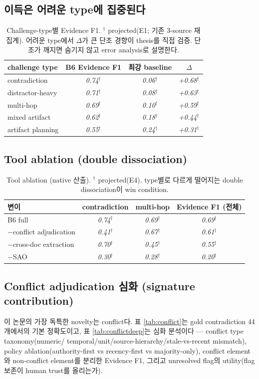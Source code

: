 \documentclass[11pt]{article}
\newcommand{\proj}[1]{\textit{#1}$^\dagger$}
\begin{document}
\subsection{이득은 어려운 type에 집중된다}
\begin{table}[h]
\centering\small
\begin{tabular}{lccc}
\toprule
challenge type & B6 Evidence F1 & 최강 baseline & $\Delta$ \\
\midrule
contradiction     & \proj{0.74} & \proj{0.06} & \proj{+0.68} \\
distractor-heavy  & \proj{0.71} & \proj{0.08} & \proj{+0.63} \\
multi-hop         & \proj{0.69} & \proj{0.10} & \proj{+0.59} \\
mixed artifact    & \proj{0.62} & \proj{0.18} & \proj{+0.44} \\
artifact planning & \proj{0.55} & \proj{0.24} & \proj{+0.31} \\
\bottomrule
\end{tabular}
\caption{Challenge-type별 Evidence F1. $^\dagger$ projected(E1; 기존 3-source 재집계). 어려운
type에서 $\Delta$가 큰 단조 경향이 thesis를 직접 검증. 단조가 깨지면 숨기지 않고 error analysis로
설명한다.}
\label{tab:bytype}
\end{table}

\subsection{Tool ablation (double dissociation)}
\begin{table}[h]
\centering\small
\begin{tabular}{lccc}
\toprule
변이 & contradiction & multi-hop & Evidence F1 (전체) \\
\midrule
B6 full & \proj{0.74} & \proj{0.69} & \proj{0.69} \\
$-$conflict adjudication & \proj{0.41} & \proj{0.67} & \proj{0.61} \\
$-$cross-doc extraction & \proj{0.70} & \proj{0.45} & \proj{0.55} \\
$-$SAO & \proj{0.30} & \proj{0.28} & \proj{0.20} \\
\bottomrule
\end{tabular}
\caption{Tool ablation (native 산출). $^\dagger$ projected(E4). type별로 다르게 떨어지는 double
dissociation이 win condition.}
\label{tab:ablation}
\end{table}

\subsection{Conflict adjudication 심화 (signature contribution)}
이 논문의 가장 독특한 novelty는 conflict다. 표 \ref{tab:conflict}는 gold contradiction 44개에서의
기본 정확도이고, 표 \ref{tab:conflictdeep}는 심화 분석이다 — conflict type taxonomy(numeric/
temporal/unit/source-hierarchy/stale-vs-recent mismatch), policy ablation(authority-first vs
recency-first vs majority-only), conflict element와 non-conflict element를 분리한 Evidence F1,
그리고 unresolved flag의 utility(flag 보존이 human trust를 올리는가).
\end{document}
